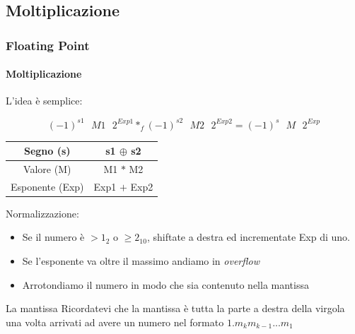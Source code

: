 \documentclass{beamer}
\begin{document}
  \subsection{Moltiplicazione}
  \begin{frame}
    \frametitle{Floating Point}
    \framesubtitle{Moltiplicazione}
		L'idea è semplice:    
    
    $$(-1)^{s1} \text{ } M1 \text{ } 2^{Exp1} *_{f} (-1)^{s2} \text{ } M2 \text{ } 2^{Exp2} = (-1)^{s} \text{ } M \text{ } 2^{Exp}$$
  	
  		\begin{center}
  			\begin{tabular}{|cc|}
  			\hline 
  			Segno (s) & s1 $\oplus$ s2 \\ 
  			\hline 
  			Valore (M) & M1 $*$ M2 \\ 
  			\hline 
  			Esponente (Exp) & Exp1 $+$ Exp2 \\ 
  			\hline 
  			\end{tabular} 
  		\end{center}
	  
	  \vspace{1em}
	  
	  Normalizzazione:
	  \begin{itemize}
	  		\item Se il numero è $> 1_{2}$ o $\geq 2_{10}$, shiftate a destra ed incrementate Exp di uno.
	  		\item Se l'esponente va oltre il massimo andiamo in \emph{overflow}
	  		\item Arrotondiamo il numero in modo che sia contenuto nella mantissa
	  \end{itemize}

		\vspace{1em}
		\begin{block}{La mantissa}
			Ricordatevi che la mantissa è tutta la parte a destra della virgola una volta
			arrivati ad avere un numero nel formato $1.m_{k}m_{k-1}\text{...}m_{1}$
		\end{block}
  \end{frame}
\end{document}
